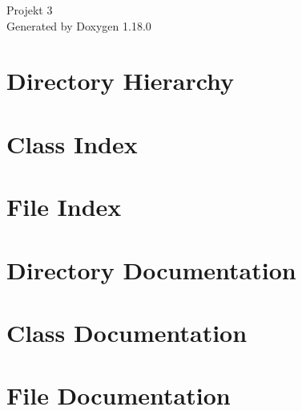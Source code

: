 \documentclass[twoside]{book}
\newcommand{\+}{\discretionary{\mbox{\scriptsize$\hookleftarrow$}}{}{}}
\newcommand{\clearemptydoublepage}{%
    \newpage{\pagestyle{empty}\cleardoublepage}%
  }
\begin{document}
  \raggedbottom
    \hypersetup{pageanchor=false,
                bookmarksnumbered=true,
                pdfencoding=unicode
               }
  \begin{titlepage}
  \vspace*{7cm}
  \begin{center}%
  {\Large Projekt 3}\\
  \vspace*{1cm}
  {\large Generated by Doxygen 1.18.0}\\
  \end{center}
  \end{titlepage}
  \clearemptydoublepage
  \tableofcontents
  \clearemptydoublepage
  \hypersetup{pageanchor=true}
\chapter{Directory Hierarchy}

\chapter{Class Index}

\chapter{File Index}

\chapter{Directory Documentation}


\chapter{Class Documentation}

\chapter{File Documentation}




  \backmatter
  \newpage
  \clearemptydoublepage
  \printindex
\end{document}
